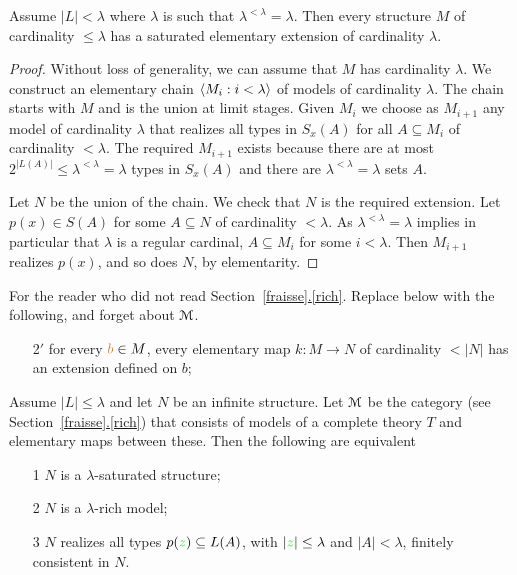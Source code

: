 \documentclass[creche.tex]{subfiles}
\begin{document}
\begin{theorem}\label{thm_esistenza_staturo_card_inacc}
Assume $|L|<\lambda$ where $\lambda$ is such that $\lambda^{<\lambda}=\lambda$. Then every structure $M$ of cardinality $\le\lambda$ has a saturated elementary extension of cardinality $\lambda$.
\end{theorem}

\begin{proof}
Without loss of generality, we can assume that $M$ has cardinality $\lambda$. We construct an elementary chain $\langle M_i : i<\lambda\rangle$ of models of cardinality $\lambda$. The chain starts with $M$ and is the union at limit stages. Given $M_i$ we choose as $M_{i+1}$ any model of cardinality $\lambda$ that realizes all types in $S_x(A)$ for all $A\subseteq M_i$ of cardinality $<\lambda$. The required $M_{i+1}$ exists because there are at most $2^{|L(A)|}\le\lambda^{<\lambda}=\lambda$ types in $S_x(A)$ and there are $\lambda^{<\lambda}=\lambda$ sets $A$.

Let $N$ be the union of the chain. We check that $N$ is the required extension. Let $p(x)\in S(A)$ for some $A\subseteq N$ of cardinality $<\lambda$. As $\lambda^{<\lambda}=\lambda$ implies in particular that $\lambda$ is a regular cardinal,  $A\subseteq M_i$ for some $i<\lambda$. Then $M_{i+1}$ realizes $p(x)$, and so does $N$, by elementarity.
\end{proof}

\begin{remark}
For the reader who did not read Section~\hyperref[rich]{\ref*{fraisse}.\ref*{rich}}. Replace  below with the following, and forget about $\EuScript M$.
\begin{itemize}
\item[2$'$] for every ${\color{brown} b}\in M$,  every elementary map $k:M\to N$ of cardinality $<|N|$ has an extension defined on $b$;
\end{itemize}
\end{remark}


\begin{theorem}\label{saturo->ricco}
Assume $|L|\le\lambda$ and let $N$ be an infinite structure. Let $\EuScript M$ be the category (see Section~\hyperref[rich]{\ref*{fraisse}.\ref*{rich}}) that consists of models of a complete theory $T$ and elementary maps between these. Then the following are equivalent
\begin{itemize}
\item[1] $N$ is a $\lambda$-saturated structure;
\item[2] $N$ is a $\lambda$-rich model;
\item[3] $N$ realizes all types $p({\color{green} z})\subseteq L(A)$, with $|{\color{green} z}|\le\lambda$ and $|A|<\lambda$, finitely consistent in $N$.
\end{itemize}
\end{theorem}
\end{document}

